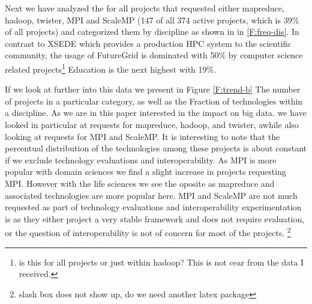 Next we have analyzed the for all projects that requested either mapreduce,
hadoop, twister, MPI and ScaleMP (147 of all 374 active projects,
which is 39\% of all projects) and categorized them by discipline as
shown in in \ref{F:freq-dis}. In contrast to XSEDE which provides a production HPC
system to the scientific community, the usage of FutureGrid is
dominated with 50\% by computer science related projects\footnote{is
  this for all projects or just within hadoop? This is not cear from
  the data I received.} Education is the next highest with 19\%.


If we look at further into this data we present in Figure
\ref{F:trend-b} The number of projects in a particular category, as
well as the Fraction of technologies within a discipline. As we are in
this paper interested in the impact on big data. we have looked in
particular at requests for mapreduce, hadoop, and twister, awhile also looking at
requests for MPI and ScaleMP. It is interesting to note that the
percentual distribution of the technologies among these projects is
about constant if we exclude technology evaluations and interoperability. As
MPI is more popular with domain sciences we find a slight increase in
projects requesting MPI. However with the life sciences we see the
oposite as mapreduce and associated technologies are more popular
here. MPI and ScaleMP are not much requested as part of technology
evaluations and interoperability experimentation is as they either
project a very stable framework and does not require evaluation, or
the question of interoperability is not of concern for most of the projects.
\footnote{slash box does not show up, do we need another latex package}





